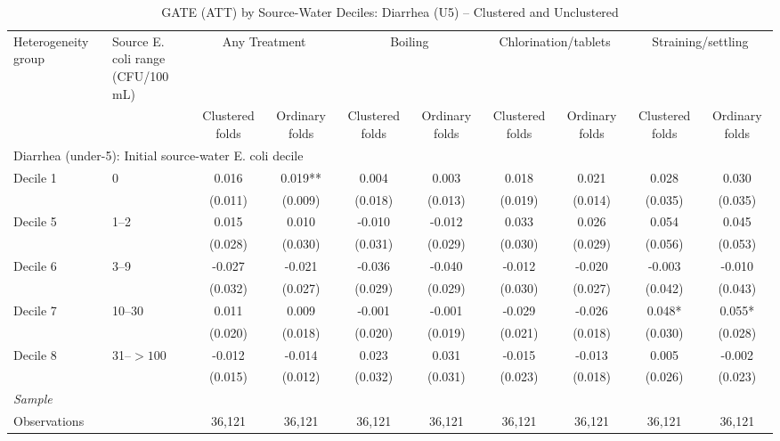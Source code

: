\begin{landscape}
\begin{table}[p]
\centering
\caption{GATE (ATT) by Source-Water Deciles: Diarrhea (U5) -- Clustered and Unclustered}
\label{tab:table_gate_appendix_deciles-diarrhea}
\scriptsize\setlength{\tabcolsep}{4pt}
\begin{adjustbox}{max width=\linewidth, center}
\begin{tabular}{llcccccccc}
\toprule
Heterogeneity group & \shortstack{Source E. coli range\\(CFU/100 mL)} & \multicolumn{2}{c}{Any Treatment} & \multicolumn{2}{c}{Boiling} & \multicolumn{2}{c}{Chlorination/tablets} & \multicolumn{2}{c}{Straining/settling} \\
 &  & Clustered folds & Ordinary folds & Clustered folds & Ordinary folds & Clustered folds & Ordinary folds & Clustered folds & Ordinary folds \\
\midrule
\multicolumn{10}{l}{Diarrhea (under-5): Initial source-water E. coli decile} \\
Decile 1 & 0 & 0.016 & 0.019** & 0.004 & 0.003 & 0.018 & 0.021 & 0.028 & 0.030 \\
 &  & (0.011) & (0.009) & (0.018) & (0.013) & (0.019) & (0.014) & (0.035) & (0.035) \\
Decile 5 & 1--2 & 0.015 & 0.010 & -0.010 & -0.012 & 0.033 & 0.026 & 0.054 & 0.045 \\
 &  & (0.028) & (0.030) & (0.031) & (0.029) & (0.030) & (0.029) & (0.056) & (0.053) \\
Decile 6 & 3--9 & -0.027 & -0.021 & -0.036 & -0.040 & -0.012 & -0.020 & -0.003 & -0.010 \\
 &  & (0.032) & (0.027) & (0.029) & (0.029) & (0.030) & (0.027) & (0.042) & (0.043) \\
Decile 7 & 10--30 & 0.011 & 0.009 & -0.001 & -0.001 & -0.029 & -0.026 & 0.048* & 0.055* \\
 &  & (0.020) & (0.018) & (0.020) & (0.019) & (0.021) & (0.018) & (0.030) & (0.028) \\
Decile 8 & 31--$>100$ & -0.012 & -0.014 & 0.023 & 0.031 & -0.015 & -0.013 & 0.005 & -0.002 \\
 &  & (0.015) & (0.012) & (0.032) & (0.031) & (0.023) & (0.018) & (0.026) & (0.023) \\
\multicolumn{10}{l}{\textit{Sample}} \\
\quad Observations &  & 36,121 & 36,121 & 36,121 & 36,121 & 36,121 & 36,121 & 36,121 & 36,121 \\

\end{tabular}
\end{adjustbox}
\end{table}
\end{landscape}
